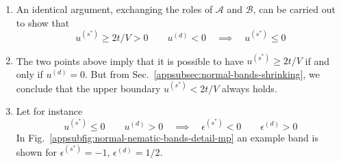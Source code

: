 \begin{enumerate}
	From Eq.~\eqref{appeq:BZ-A-def}, $\forall \mathbf{k} \in \mathcal{A}$ the form factors $\cos k_x \pm \cos k_y$ are positive by construction. By hypothesis $\epsilon^{(s^*)} \ge 0$ and $\epsilon^{(d)} > 0$. Hence:
	\[
	\forall \mathbf{k} \in \mathcal{A}
	\quad\colon\quad
	\begin{aligned}
		\tilde{\epsilon}_\mathbf{k} &= \overbrace{\epsilon^{(s^*)} \left( \cos k_x + \cos k_y \right)}^{\ge 0} + \overbrace{\epsilon^{(d)}  \left( \cos k_x - \cos k_y \right) }^{\ge 0} \\
		\tilde{\epsilon}_{\mathcal{R}\mathbf{k}} &= \underbrace{\epsilon^{(s^*)} \left( \cos k_x + \cos k_y \right)}_{\ge 0} - \underbrace{\epsilon^{(d)}  \left( \cos k_x - \cos k_y \right) }_{\ge 0}
	\end{aligned}
	\]
	Summing the two equations above we have:
	\[
	\forall \mathbf{k} \in \mathcal{A}
	\quad\colon\quad
	\tilde{\epsilon}_\mathbf{k} + \tilde{\epsilon}_{\mathcal{R}\mathbf{k}} \ge 0
	\]
	thus $\tilde{\epsilon}_\mathbf{k} \ge -\tilde{\epsilon}_{\mathcal{R}\mathbf{k}}$.	The Fermi-Dirac distribution is monotonically descendent. Then:
	\[
	\forall \mathbf{k} \in \mathcal{A}
	\quad\colon\quad
	\begin{aligned}
		f(\tilde{\epsilon}_\mathbf{k};\beta,\tilde{\mu}) &\le f(-\tilde{\epsilon}_{\mathcal{R}\mathbf{k}};\beta,\tilde{\mu}) \\
		f(-\tilde{\epsilon}_\mathbf{k};\beta,\tilde{\mu}) &\ge f(\tilde{\epsilon}_{\mathcal{R}\mathbf{k}};\beta,\tilde{\mu}) 
	\end{aligned}
	\]
	This condition, inserted in Eq.~\eqref{appeq:normal-us*-AR}, leads to an absurd:
	\[
	u^{(s^*)} \ge 2t/V \qquad
	u^{(d)} > 0
	\quad\implies\quad
	u^{(s^*)} \le 0
	\]
	\item An identical argument, exchanging the roles of $\mathcal{A}$ and $\mathcal{B}$, can be carried out to show that
	\[
	u^{(s^*)} \ge 2t/V > 0
	\qquad
	u^{(d)} < 0
	\quad\implies\quad
	u^{(s^*)} \le 0
	\]
	\item The two points above imply that it is possible to have $u^{(s^*)} \ge 2t/V$ if and only if $u^{(d)}=0$. But from Sec.~\ref{appsubsec:normal-bands-shrinking}, we conclude that the upper boundary $u^{(s^*)} < 2t/V$ always holds.
	\item Let for instance
	\[
	u^{(s^*)} \le 0
	\qquad
	u^{(d)} > 0
	\quad\implies\quad
	\epsilon^{(s^*)} < 0
	\qquad
	\epsilon^{(d)} > 0
	\]
	In Fig.~\ref{appsubfig:normal-nematic-bands-detail-mp} an example band is shown for $\epsilon^{(s^*)}=-1$, $\epsilon^{(d)}=1/2$.
	

\end{enumerate}
